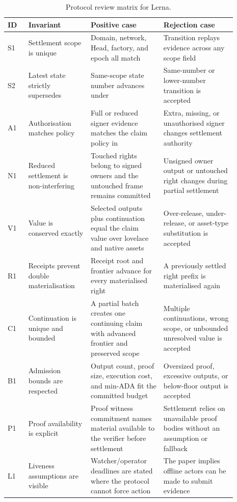 \documentclass[a4paper,11pt]{article}
\theoremstyle{definition}
\theoremstyle{plain}
\theoremstyle{remark}
\begin{document}
\begin{longtable}{L{0.08\linewidth}L{0.24\linewidth}L{0.28\linewidth}L{0.29\linewidth}}
\caption{Protocol review matrix for Lerna.}
\\
\toprule
\textbf{ID} & \textbf{Invariant} & \textbf{Positive case} & \textbf{Rejection case}\\
\midrule
\endhead
S1 & Settlement scope is unique & Domain, network, Head, factory, and epoch all
match  & Transition replays evidence across any scope field\\
S2 & Latest state strictly supersedes & Same-scope state number advances under
 & Same-number or lower-number transition is
accepted\\
A1 & Authorisation matches policy & Full or reduced signer evidence matches the
claim policy in  & Extra, missing, or unauthorised signer
changes settlement authority\\
N1 & Reduced settlement is non-interfering & Touched rights belong to signed
owners and the untouched frame remains committed & Unsigned owner output or
untouched right changes during partial settlement\\
V1 & Value is conserved exactly & Selected outputs plus continuation equal the
claim value over lovelace and native assets & Over-release, under-release, or
asset-type substitution is accepted\\
R1 & Receipts prevent double materialisation & Receipt root and frontier advance
for every materialised right & A previously settled right prefix is materialised
again\\
C1 & Continuation is unique and bounded & A partial batch creates one continuing
claim with advanced frontier and preserved scope & Multiple continuations, wrong
scope, or unbounded unresolved value is accepted\\
B1 & Admission bounds are respected & Output count, proof size, execution cost,
and min-ADA fit the committed budget & Oversized proof, excessive outputs, or
below-floor output is accepted\\
P1 & Proof availability is explicit & Proof witness commitment names material
available to the verifier before settlement & Settlement relies on unavailable
proof bodies without an assumption or fallback\\
L1 & Liveness assumptions are visible & Watcher/operator deadlines are stated
where the protocol cannot force action & The paper implies offline actors can be
made to submit evidence\\
\bottomrule
\end{longtable}
\end{document}
